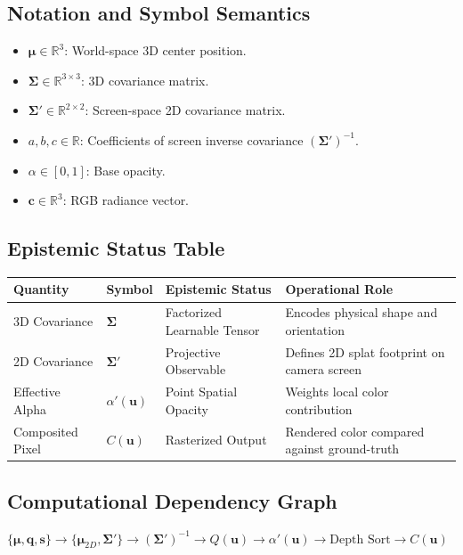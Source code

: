 \documentclass[11pt,a4paper]{article}
\theoremstyle{definition}
\begin{document}
\subsection{Notation and Symbol Semantics}
\begin{itemize}
    \item $\boldsymbol{\mu} \in \mathbb{R}^3$: World-space 3D center position.
    \item $\boldsymbol{\Sigma} \in \mathbb{R}^{3 \times 3}$: 3D covariance matrix.
    \item $\boldsymbol{\Sigma}' \in \mathbb{R}^{2 \times 2}$: Screen-space 2D covariance matrix.
    \item $a, b, c \in \mathbb{R}$: Coefficients of screen inverse covariance $(\boldsymbol{\Sigma}')^{-1}$.
    \item $\alpha \in [0, 1]$: Base opacity.
    \item $\mathbf{c} \in \mathbb{R}^3$: RGB radiance vector.
\end{itemize}

\subsection{Epistemic Status Table}
\begin{table}[h]
\centering
\small
\begin{tabular}{@{}llll@{}}
\toprule
\textbf{Quantity} & \textbf{Symbol} & \textbf{Epistemic Status} & \textbf{Operational Role} \\
\midrule
3D Covariance & $\boldsymbol{\Sigma}$ & Factorized Learnable Tensor & Encodes physical shape and orientation \\
2D Covariance & $\boldsymbol{\Sigma}'$ & Projective Observable & Defines 2D splat footprint on camera screen \\
Effective Alpha & $\alpha'(\mathbf{u})$ & Point Spatial Opacity & Weights local color contribution \\
Composited Pixel & $C(\mathbf{u})$ & Rasterized Output & Rendered color compared against ground-truth \\
\bottomrule
\end{tabular}
\end{table}

\subsection{Computational Dependency Graph}
{\centering
$\{\boldsymbol{\mu}, \mathbf{q}, \mathbf{s}\} \longrightarrow \{\boldsymbol{\mu}_{2D}, \boldsymbol{\Sigma}'\} \longrightarrow (\boldsymbol{\Sigma}')^{-1} \longrightarrow Q(\mathbf{u}) \longrightarrow \alpha'(\mathbf{u}) \longrightarrow \text{Depth Sort} \longrightarrow C(\mathbf{u})$
\par}
\end{document}
